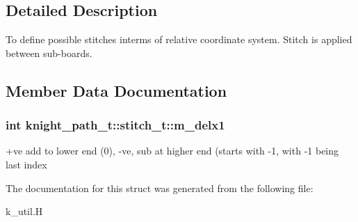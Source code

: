 \subsection{\-Detailed \-Description}
\-To define possible stitches interms of relative coordinate system. \-Stitch is applied between sub-\/boards. 

\subsection{\-Member \-Data \-Documentation}
\hypertarget{structknight__path__t_1_1stitch__t_a1068379b0687791fa8573f79c4c67788}{
\subsubsection[{m\-\_\-delx1}]{\setlength{\rightskip}{0pt plus 5cm}int {\bf knight\-\_\-path\-\_\-t\-::stitch\-\_\-t\-::m\-\_\-delx1}}}\label{structknight__path__t_1_1stitch__t_a1068379b0687791fa8573f79c4c67788}
+ve add to lower end (0), -\/ve, sub at higher end (starts with -\/1, with -\/1 being last index 

\-The documentation for this struct was generated from the following file\-:\begin{DoxyCompactItemize}
\item 
k\-\_\-util.\-H\end{DoxyCompactItemize}

